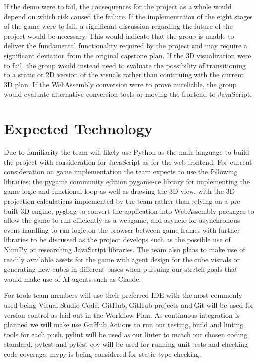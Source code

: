 \documentclass{article}
\begin{document}
If the demo were to fail, the consequences for the project as a whole would depend on which risk caused the failure. If the implementation of the eight stages of the game were to fail, a significant discussion regarding the future of the project would be necessary. 
This would indicate that the group is unable to deliver the fundamental functionality required by the project and may require a significant deviation from the original capstone plan. 
If the 3D visualization were to fail, the group would instead need to evaluate the possibility of transitioning to a static or 2D version of the visuals rather than continuing with the current 3D plan.
If the WebAssembly conversion were to prove unreliable, the group would evaluate alternative conversion tools or moving the frontend to JavaScript.

\section{Expected Technology}

Due to familiarity the team will likely use Python as the main language to build the project with consideration for JavaScript as for the web frontend.
 For current consideration on game implementation the team expects to use the following libraries: the pygame community edition pygame-ce library for implementing the game logic and functional loop as well as drawing the 3D view, with the 3D projection calculations implemented by the team rather than relying on a pre-built 3D engine, pygbag to convert the application into WebAssembly packages to allow the game to run efficiently as a webgame, and asyncio for asynchronous event handling to run logic on the browser between game frames with further libraries to be discussed as the project develops such as the possible use of NumPy or researching JavaScript libraries. 
 The team also plans to make use of readily available assets for the game with agent design for the cube visuals or generating new cubes in different bases when pursuing our stretch goals that would make use of AI agents such as Claude. 

 For tools team members will use their preferred IDE with the most commonly used being Visual Studio Code, GitHub, GitHub projects and Git will be used for version control as laid out in the Workflow Plan. As continuous integration is planned we will make use GitHub Actions to run our testing, build and linting tools for each push, 
 pylint will be used as our linter to match our chosen coding standard, pytest and pytest-cov will be used for running unit tests and checking code coverage, mypy is being considered for static type checking. 
\end{document}
